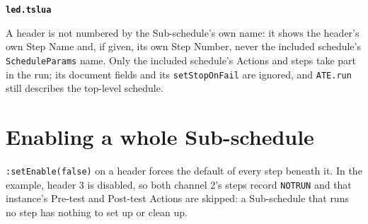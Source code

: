 \noindent\textbf{\texttt{led.tslua}}\par


A header is not numbered by the Sub-schedule's own name: it shows the header's own Step Name
and, if given, its own Step Number, never the included schedule's \texttt{ScheduleParams}
name. Only the included schedule's Actions and steps take part in the run; its document fields
and its \texttt{setStopOnFail} are ignored, and \texttt{ATE.run} still describes the top-level
schedule.

\section{Enabling a whole Sub-schedule}

\texttt{:setEnable(false)} on a header forces the default of every step beneath it. In the
example, header 3 is disabled, so both channel 2's steps record \texttt{NOTRUN} and that
instance's Pre-test and Post-test Actions are skipped: a Sub-schedule that runs no step has
nothing to set up or clean up.

